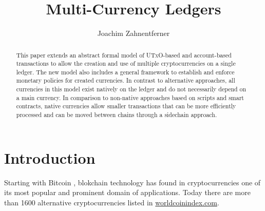 \documentclass{llncs}
\newcommand{\utxo}{\textsc{UTxO}\xspace}
\begin{document}
\title{Multi-Currency Ledgers}


\author{
  Joachim Zahnentferner\\%
}




\maketitle

\begin{abstract}
This paper extends an abstract formal model of \utxo-based and account-based transactions to allow the creation and use of multiple cryptocurrencies on a single ledger. The new model also includes a general framework to establish and enforce monetary policies for created currencies. In contrast to alternative approaches, all currencies in this model exist natively on the ledger and do not necessarily depend on a main currency. In comparison to non-native approaches based on scripts and smart contracts, native currencies allow smaller transactions that can be more efficiently processed and can be moved between chains through a sidechain approach.
\end{abstract}


\section{Introduction}

Starting with Bitcoin \cite{Nakamoto2008}, blokchain technology has found in cryptocurrencies one of its 
most popular and prominent domain of applications. Today there are more than 1600 alternative cryptocurrencies listed in \url{worldcoinindex.com}.
\end{document}
